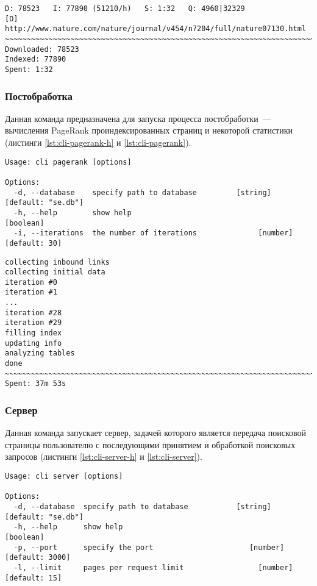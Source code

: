 \begin{lstlisting}[caption=Интерфейс командной строки: поисковой робот., label=lst:cli-crawl]
D: 78523   I: 77890 (51210/h)   S: 1:32   Q: 4960|32329
[D] http://www.nature.com/nature/journal/v454/n7204/full/nature07130.html
~~~~~~~~~~~~~~~~~~~~~~~~~~~~~~~~~~~~~~~~~~~~~~~~~~~~~~~~~~~~~~~~~~~~~~~~~~~~~~
Downloaded: 78523
Indexed: 77890
Spent: 1:32
\end{lstlisting}


\subsubsection*{Постобработка}
Данная команда предназначена для запуска процесса постобработки~--- вычисления PageRank проиндексированных страниц и некоторой статистики (листинги \ref{lst:cli-pagerank-h} и \ref{lst:cli-pagerank}).
\begin{lstlisting}[caption=Интерфейс командной строки: постобработка., label=lst:cli-pagerank-h]
Usage: cli pagerank [options]

Options:
  -d, --database    specify path to database         [string] [default: "se.db"]
  -h, --help        show help                                          [boolean]
  -i, --iterations  the number of iterations              [number] [default: 30]
\end{lstlisting}

\begin{lstlisting}[caption=Интерфейс командной строки: постобработка., label=lst:cli-pagerank]
collecting inbound links
collecting initial data
iteration #0
iteration #1
...
iteration #28
iteration #29
filling index
updating info
analyzing tables
done
~~~~~~~~~~~~~~~~~~~~~~~~~~~~~~~~~~~~~~~~~~~~~~~~~~~~~~~~~~~~~~~~~~~~~~~~~~~~~~
Spent: 37m 53s
\end{lstlisting}


\subsubsection*{Сервер}
Данная команда запускает сервер, задачей которого является передача поисковой страницы пользователю с последующими принятием и обработкой поисковых запросов (листинги \ref{lst:cli-server-h} и \ref{lst:cli-server}).
\begin{lstlisting}[caption=Интерфейс командной строки: сервер., label=lst:cli-server-h]
Usage: cli server [options]

Options:
  -d, --database  specify path to database           [string] [default: "se.db"]
  -h, --help      show help                                            [boolean]
  -p, --port      specify the port                      [number] [default: 3000]
  -l, --limit     pages per request limit                 [number] [default: 15]
\end{lstlisting}

